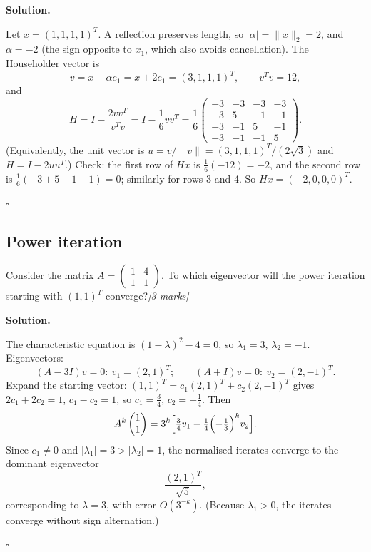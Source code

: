 \documentclass[11pt,a4paper]{article}
\newenvironment{solution}
  {\par\noindent\textbf{Solution.}\par\nobreak}
  {\par\hfill\(\square\)\par}
\newcommand{\mk}[1]{\hfill\textit{[#1 marks]}}
\newcommand{\norm}[1]{\lVert#1\rVert}
\begin{document}
\begin{solution}
Let \(x=(1,1,1,1)^T\).  A reflection preserves length, so
\(|\alpha|=\norm x_2=2\), and \(\alpha=-2\) (the sign opposite to
\(x_1\), which also avoids cancellation).  The Householder vector is
\[
  v=x-\alpha e_1=x+2e_1=(3,1,1,1)^T,\qquad v^Tv=12,
\]
and
\[
  H=I-\frac{2vv^T}{v^Tv}=I-\frac16vv^T
  =\frac16\begin{pmatrix}
    -3&-3&-3&-3\\
    -3&5&-1&-1\\
    -3&-1&5&-1\\
    -3&-1&-1&5
  \end{pmatrix}.
\]
(Equivalently, the unit vector is \(u=v/\norm v=(3,1,1,1)^T/(2\sqrt3)\)
and \(H=I-2uu^T\).)  Check: the first row of \(Hx\) is
\(\frac16(-12)=-2\), and the second row is
\(\frac16(-3+5-1-1)=0\); similarly for rows 3 and 4.  So
\(Hx=(-2,0,0,0)^T\).
\end{solution}

\subsection{Power iteration}

\begin{qbox}
Consider the matrix \(A=\begin{pmatrix}1&4\\1&1\end{pmatrix}\).  To which
eigenvector will the power iteration starting with \((1,1)^T\)
converge?\mk{3}
\end{qbox}

\begin{solution}
The characteristic equation is \((1-\lambda)^2-4=0\), so
\(\lambda_1=3\), \(\lambda_2=-1\).  Eigenvectors:
\[
  (A-3I)v=0:\ v_1=(2,1)^T;\qquad (A+I)v=0:\ v_2=(2,-1)^T .
\]
Expand the starting vector:
\((1,1)^T=c_1(2,1)^T+c_2(2,-1)^T\) gives \(2c_1+2c_2=1\),
\(c_1-c_2=1\), so \(c_1=\frac34\), \(c_2=-\frac14\).  Then
\[
  A^k\begin{pmatrix}1\\1\end{pmatrix}
  =3^k\Bigl[\tfrac34v_1-\tfrac14\Bigl(-\tfrac13\Bigr)^kv_2\Bigr].
\]
Since \(c_1\ne0\) and \(|\lambda_1|=3>|\lambda_2|=1\), the normalised
iterates converge to the dominant eigenvector
\[
  \frac{(2,1)^T}{\sqrt5},
\]
corresponding to \(\lambda=3\), with error \(O(3^{-k})\).  (Because
\(\lambda_1>0\), the iterates converge without sign alternation.)
\end{solution}
\end{document}
